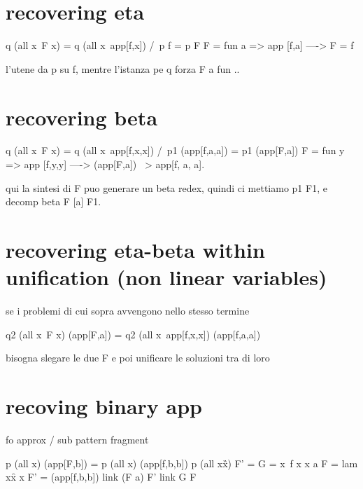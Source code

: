 \documentclass{rapport}
\begin{document}
\section{recovering eta}

\begin{elpicode}
q (all x\ F x) = q (all x\ app[f,x]) /\ p f = p F
F = fun a => app [f,a] ----> F = f
\end{elpicode}

l'utene da p su f, mentre l'istanza pe q forza F a fun .. 

\section{recovering beta}

\begin{elpicode}
  q (all x\ F x) = q (all x\ app[f,x,x]) /\ p1 (app[f,a,a]) = p1 (app[F,a])
  F = fun y => app [f,y,y] ----> (app[F,a]) ~> app[f, a, a].
\end{elpicode}
  
qui la sintesi di F puo generare un beta redex, quindi ci mettiamo
p1 F1, e decomp beta F [a] F1.

\section{recovering eta-beta within unification (non linear variables)}

se i problemi di cui sopra avvengono nello stesso termine

\begin{elpicode}
  q2 (all x\ F x) (app[F,a]) = q2 (all x\ app[f,x,x]) (app[f,a,a])
\end{elpicode}

bisogna slegare le due F e poi unificare le soluzioni tra di loro

\section{recoving binary app}

fo approx / sub pattern fragment

\begin{elpicode}
  p (all x\app[F,x,a]) (app[F,b]) = p (all x\app[f,x,x,a]) (app[f,b,b])
  p (all x\G x) F' = 
  G = x\ f x x a
  F = lam x\f x x
  F' = (app[f,b,b])
  link (F a) F'
  link G F
\end{elpicode}


\end{document}
